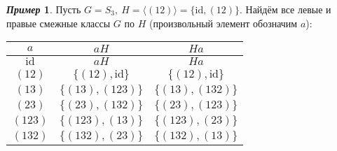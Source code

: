 \documentclass[a4paper, 14pt]{extarticle}
\newcommand{\n}{\par}
\newcommand{\id}{\mathrm{id}}
\theoremstyle{definition}
\newtheorem*{exmpl*}{\textit{Пример}}
\theoremstyle{plain}
\numberwithin{theorem}{section}
\numberwithin{definition}{section}
\numberwithin{statement}{section}
\numberwithin{lemma}{section}
\numberwithin{consequence}{section}
\begin{document}
	\begin{exmpl*}
		Пусть $G = S_3, \ H = \langle(12)\rangle = \{\id, (12)\}.$ Найдём все левые и правые смежные классы $G$ по $H$ (произвольный элемент обозначим $a$):
		\begin{center}
			\begin{tabular}{c|c|c}
				$a$ & $aH$ & $Ha$\\
				\hline
				$\id$ & $aH$ & $Ha$ \\
				\hline
				$(12)$ & $\{(12), \id\}$ & $\{(12), \id\}$ \\
				\hline
				$(13)$ & $\{(13), (123)\}$ & $\{(13), (132)\}$ \\
				\hline
				$(23)$ & $\{(23), (132)\}$ & $\{(23), (123)\}$ \\
				\hline
				$(123)$ & $\{(123), (13)\}$ & $\{(123), (23)\}$ \\
				\hline
				$(132)$ & $\{(132), (23)\}$ & $\{(132), (13)\}$
			\end{tabular}
		\end{center} \n
	\end{exmpl*}
	\newpage
\end{document}
